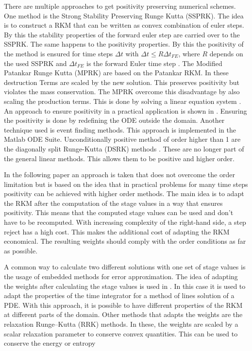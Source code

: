 \documentclass[a4paper]{scrartcl}
\numberwithin{equation}{section}
\theoremstyle{plain}
\theoremstyle{definition}
\numberwithin{theorem}{section}
\newcommand{\dt}{{\Delta t}}
\newcommand{\1}{\mathbbm{1}}
\begin{document}
There are multiple approaches to get positivity preserving numerical schemes.
One method is the Strong Stability Preserving Runge Kutta (SSPRK). 
The idea is to construct a RKM that can be written as convex combination of euler steps. 
By this the stability properties of the forward euler step are carried over to the SSPRK.
The same happens to the positivity properties. By this the positivity of the method is ensured for time steps $\dt$ with $\dt \leq R \dt_{FE}$, where $R$ depends on the used SSPRK and $\dt_{FE}$ is the forward Euler time step \cite{gottlieb_strong_2011}. 
The Modified Patankar Runge Kutta (MPRK) are 
based on the Patankar RKM. In these destruction Terms are scaled by the new solution. This preserves positivity but violates the mass conservation. The MPRK overcome this disadvantage by also scaling the production terms. This is done by solving a linear equation system \cite{kopecz_comparison_2019}.
An approach to ensure positivity in a practical application is shown in \cite{shampine_non-negative_2005}. Ensuring the positivity is done by redefining the ODE outside the domain. Another technique used is event finding methods. This approach is implemented in the Matlab ODE Suite.
Unconditionally positive method of order higher than 1 are the diagonally split Runge-Kutta (DSRK) methods \cite{horvath_positivity_1998}. These are no longer part of the general linear methods. This allows them to be positive and higher order. 

In the following paper an approach is taken that does not overcome the order limitation but is based on the idea that in practical problems for many time steps positivity can be achieved with higher order methods.
The main idea is to adapt the RKM after the computation of the stage values in a way that ensures positivity.  
This means that the computed stage values can be used and don't have to be recomputed. With increasing complexity of the right-hand side, a step reject has a high cost. This makes the additional cost of adapting the RKM economical.
The resulting weights should comply with the order conditions as far as possible.

A common way to calculate two different solutions with one set of stage values is the usage of embedded methods for error approximation. 
The idea of adapting the weights after calculating the stage values is used in \cite{ketcheson_spatially_2013}.
In this case it is used to adapt the properties of the time integrator for a method of lines solution of a PDE. With this approach, it is possible to have different properties of the RKM at different parts of the domain. 
Other methods that adapts the weights are the relaxation Runge–Kutta (RRK) methods. 
In these, the weights are scaled by a scalar relaxation parameter to conserve convex quantities. This can be used to conserve the energy or entropy \cite{ranocha_relaxation_2019,ketcheson_relaxation_2019}
\end{document}
